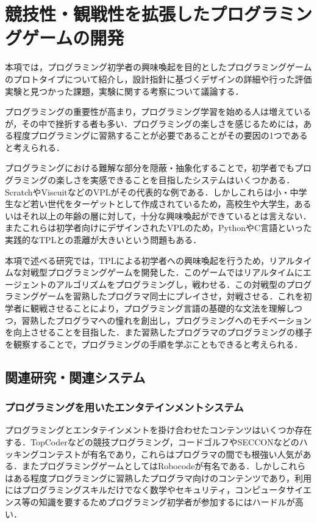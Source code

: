 \section{競技性・観戦性を拡張したプログラミングゲームの開発}
本項では，プログラミング初学者の興味喚起を目的としたプログラミングゲームのプロトタイプについて紹介し，設計指針に基づくデザインの詳細や行った評価実験と見つかった課題，実験に関する考察について議論する．

プログラミングの重要性が高まり，プログラミング学習を始める人は増えているが，その中で挫折する者も多い．プログラミングの楽しさを感じるためには，ある程度プログラミングに習熟することが必要であることがその要因の1つであると考えられる．

プログラミングにおける難解な部分を隠蔽・抽象化することで，初学者でもプログラミングの楽しさを実感できることを目指したシステムはいくつかある．ScratchやViscuitなどのVPLがその代表的な例である．しかしこれらは小・中学生など若い世代をターゲットとして作成されているため，高校生や大学生，あるいはそれ以上の年齢の層に対して，十分な興味喚起ができているとは言えない．またこれらは初学者向けにデザインされたVPLのため，PythonやC言語といった実践的なTPLとの乖離が大きいという問題もある．

本項で述べる研究では，TPLによる初学者への興味喚起を行うため，リアルタイムな対戦型プログラミングゲームを開発した．このゲームではリアルタイムにエージェントのアルゴリズムをプログラミングし，戦わせる．この対戦型のプログラミングゲームを習熟したプログラマ同士にプレイさせ，対戦させる．これを初学者に観戦させることにより，プログラミング言語の基礎的な文法を理解しつつ，習熟したプログラマへの憧れを創出し，プログラミングへのモチベーションを向上させることを目指した．また習熟したプログラマのプログラミングの様子を観察することで，プログラミングの手順を学ぶこともできると考えられる．


\subsection{関連研究・関連システム}

\subsubsection{プログラミングを用いたエンタテインメントシステム}
プログラミングとエンタテインメントを掛け合わせたコンテンツはいくつか存在する．TopCoder\cite{topcoder}などの競技プログラミング，コードゴルフ\cite{codegolf}やSECCON\cite{seccon}などのハッキングコンテストが有名であり，これらはプログラマの間でも根強い人気がある．またプログラミングゲームとしてはRobocode\cite{robocode}が有名である．しかしこれらはある程度プログラミングに習熟したプログラマ向けのコンテンツであり，利用にはプログラミングスキルだけでなく数学やセキュリティ，コンピュータサイエンス等の知識を要するためプログラミング初学者が参加するにはハードルが高い．

